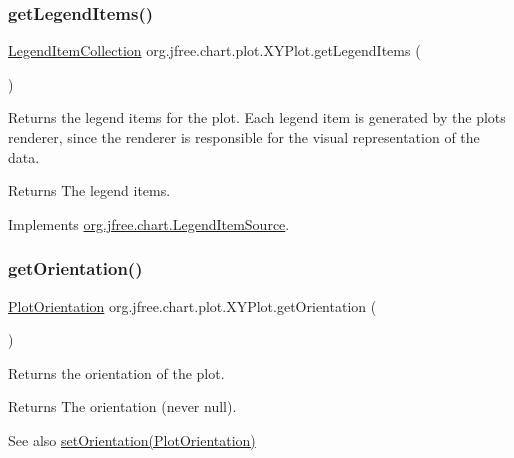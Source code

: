 \subsubsection{\texorpdfstring{get\+Legend\+Items()}{getLegendItems()}}
{\footnotesize\ttfamily \mbox{\hyperlink{classorg_1_1jfree_1_1chart_1_1_legend_item_collection}{Legend\+Item\+Collection}} org.\+jfree.\+chart.\+plot.\+X\+Y\+Plot.\+get\+Legend\+Items (\begin{DoxyParamCaption}{ }\end{DoxyParamCaption})}

Returns the legend items for the plot. Each legend item is generated by the plot\textquotesingle{}s renderer, since the renderer is responsible for the visual representation of the data.

\begin{DoxyReturn}{Returns}
The legend items. 
\end{DoxyReturn}


Implements \mbox{\hyperlink{interfaceorg_1_1jfree_1_1chart_1_1_legend_item_source_a224409463c4f7a8ef0e2a9df337e6d3b}{org.\+jfree.\+chart.\+Legend\+Item\+Source}}.

\mbox{\label{classorg_1_1jfree_1_1chart_1_1plot_1_1_x_y_plot_a5b0c5d43d190ffdfc7cdee341c0e6990}} 
\subsubsection{\texorpdfstring{get\+Orientation()}{getOrientation()}}
{\footnotesize\ttfamily \mbox{\hyperlink{classorg_1_1jfree_1_1chart_1_1plot_1_1_plot_orientation}{Plot\+Orientation}} org.\+jfree.\+chart.\+plot.\+X\+Y\+Plot.\+get\+Orientation (\begin{DoxyParamCaption}{ }\end{DoxyParamCaption})}

Returns the orientation of the plot.

\begin{DoxyReturn}{Returns}
The orientation (never {\ttfamily null}).
\end{DoxyReturn}
\begin{DoxySeeAlso}{See also}
\mbox{\hyperlink{classorg_1_1jfree_1_1chart_1_1plot_1_1_x_y_plot_ad73a9df6f61a586d34de8ac37303025b}{set\+Orientation(\+Plot\+Orientation)}} 
\end{DoxySeeAlso}


